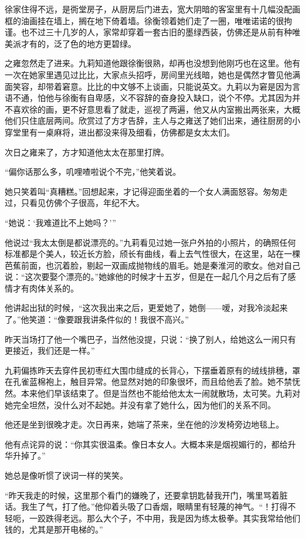 \par 徐家住得不远，是衖堂房子，从厨房后门进去，宽大阴暗的客室里有十几幅没配画框的油画挂在墙上，搁在地下倚着墙。徐衡领着她们走了一圈，唯唯诺诺的很拘谨。也不过三十几岁的人，家常却穿着一套古旧的墨绿西装，仿佛还是从前有种唯美派才有的，泛了色的地方更碧绿。
\par 之雍忽然走了进来。九莉知道他跟徐衡很熟，却再也没想到他刚巧也在这里。他有一次在她家里遇见过比比，大家点头招呼，房间里光线暗，她也是偶然才瞥见他满面笑容，却带着窘意。比比的中文够不上谈画，只能说英文。九莉以为窘是因为言语不通，怕他与徐衡有自卑感，义不容辞的奋身投入缺口，说个不停。尤其因为并不喜欢徐的画，更不好意思看了就走，巡视了两遍，他又从内室搬出两张来，大概他们只住底层两间。欣赏过了方才告辞，主人与之雍送了她们出来，通往厨房的小穿堂里有一桌麻将，进出都没来得及细看，仿佛都是女太太们。
\par 次日之雍来了，方才知道他太太在那里打牌。
\par “偏你话那么多，叽哩喳啦说个不完，”他笑着说。
\par 她只笑着叫“真糟糕。”回想起来，才记得迎面坐着的一个女人满面怒容。匆匆走过，只看见仿佛个子很高，年纪不大。
\par “她说：‘我难道比不上她吗？'”
\par 他说过“我太太倒是都说漂亮的。”九莉看见过她一张户外拍的小照片，的确照任何标准都是个美人，较近长方脸，颀长有曲线，看上去气性很大，在这里，站在一棵芭蕉前面，也沉着脸，剔起一双画成抛物线的眉毛。她是秦淮河的歌女。他对自己说：“这次要娶个漂亮的。”她嫁他的时候才十五岁，但是在一起几个月之后有了感情才有肉体关系的。
\par 他讲起出狱的时候，“这次我出来之后，更爱她了，她倒——嗳，对我冷淡起来了。”他笑道：“像要跟我讲条件似的！我很不高兴。”
\par 昨天当场打了他一个嘴巴子，当然他没提，只说：“换了别人，给她这么一闹只有更接近，我们还是一样。”
\par 九莉偏拣昨天去穿件民初枣红大围巾缝成的长背心，下摆垂着原有的绒线排穗，罩在孔雀蓝棉袍上，触目异常。他显然对她的印象很坏，而且给他丢了脸。她不禁怃然。本来他们早该结束了。但是当然也不能给他太太一闹就散场，太可笑。九莉对她完全坦然，没什么对不起她。并没有拿了她什么，因为他们的关系不同。
\par 他还是坐到很晚才走。次日再来，她端了茶来，坐在他的沙发椅旁边地毯上。
\par 他有点诧异的说：“你其实很温柔。像日本女人。大概本来是烟视媚行的，都给升华升掉了。”
\par 她总是像听惯了谀词一样的笑笑。
\par “昨天我走的时候，这里那个看门的嫌晚了，还要拿钥匙替我开门，嘴里骂着脏话。我生了气，打了他。”他仰着头吸了口香烟，眼睛里有轻蔑的神气。“！打得不轻呃，一跤跌得老远。那么大个子，不中用，我是因为练太极拳。其实我常给他们钱的，尤其是那开电梯的。”
